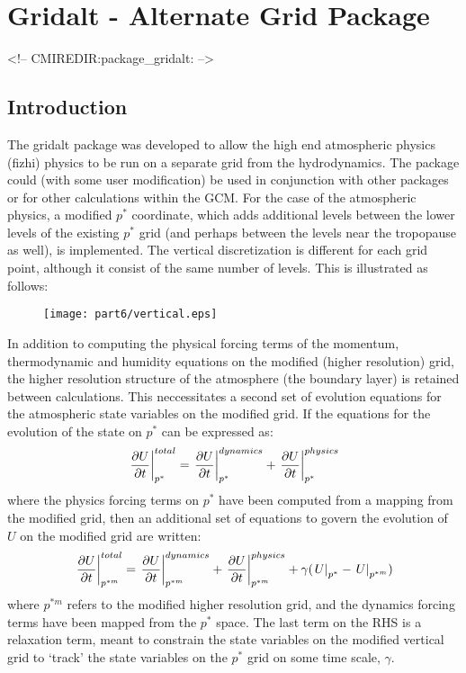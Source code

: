 \section{Gridalt - Alternate Grid Package}
\label{sec:pkg:gridalt}
\begin{rawhtml}
<!-- CMIREDIR:package_gridalt: -->
\end{rawhtml}

\subsection {Introduction} 

The gridalt package was developed to allow the high end atmospheric physics 
(fizhi) physics to be run on a separate grid from the hydrodynamics. The package
could (with some user modification) be used in conjunction with other packages 
or for other calculations within the GCM. For the case of the atmospheric 
physics, a modified $p^*$ coordinate, which adds additional levels between
the lower levels of the existing $p^*$ grid (and perhaps between the levels near 
the tropopause as well), is implemented. The vertical discretization is
different for each grid point, although it consist of the same number of 
levels. This is illustrated as follows:
\begin{figure}[htbp]
\vspace*{-0.4in}
\begin{center}
\texttt{[image: part6/vertical.eps]}
\end{center}
\end{figure}

\vspace*{-0.5in}
In addition to computing the physical forcing terms of the momentum,
thermodynamic and humidity equations on the modified (higher resolution)
grid, the higher resolution structure of the atmosphere (the boundary
layer) is retained between calculations. This neccessitates a second 
set of evolution equations for the atmospheric state variables on the 
modified grid. If the equations for the evolution of the state
on $p^*$ can be expressed as:
\[
\left . {\partial U \over {\partial t}} \right |_{p^*}^{total} = 
\left . {\partial U \over {\partial t}} \right |_{p^*}^{dynamics} + 
\left . {\partial U \over {\partial t}} \right |_{p^*}^{physics}
\]
where the physics forcing terms on $p^*$ have been computed from a
mapping from the modified grid, then an additional set of equations
to govern the evolution of $U$ on the modified grid are written:
\[
\left . {\partial U \over {\partial t}} \right |_{p^{*m}}^{total} = 
\left . {\partial U \over {\partial t}} \right |_{p^{*m}}^{dynamics} + 
\left . {\partial U \over {\partial t}} \right |_{p^{*m}}^{physics} +
\gamma ({\left . U \right |_{p^*}} - {\left . U \right |_{p^{*m}}})
\]
where $p^{*m}$ refers to the modified higher resolution grid, and
the dynamics forcing terms have been mapped from the $p^*$ space.
The last term on the RHS is a relaxation term, meant to constrain
the state variables on the modified vertical grid to `track' the
state variables on the $p^*$ grid on some time scale, $\gamma$.


